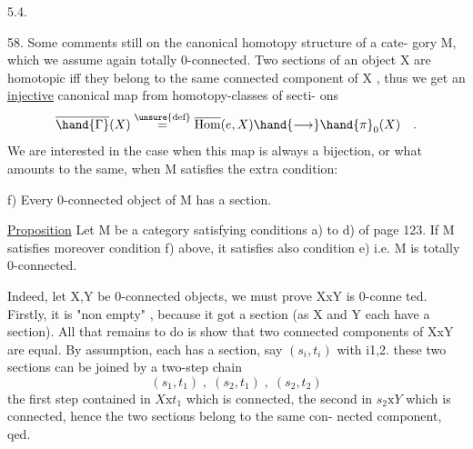 
5.4.

58.  Some comments still on the canonical homotopy structure of a cate-%
gory M,  which we assume again totally 0-connected.  Two sections of an
object X are homotopic iff they belong to the same connected component of
X ,  thus we get an \uline{injective} canonical map from homotopy-classes of secti-%
ons
\[ \overline{\hand{\Gamma}}(X) \overset{\text{\unsure{def}}}{=} \overline{\text{Hom}}(e,X) \hand{\longrightarrow} \hand{\pi}_{0}(X) \quad . \]
We are interested in the case when this map is always a bijection,  or
what amounts to the same,  when M satisfies the extra condition:

f) Every 0-connected object of M has a section.

\uline{Proposition}  Let M be a category satisfying conditions a) to d) of page
123.  If M satisfies moreover condition f) above,  it satisfies also 
condition e)  i.e. M is totally 0-connected.

Indeed,  let X,Y be 0-connected objects,  we must prove XxY is 0-conne%
ted.  Firstly,  it is "non empty" , because it got a section (as X and Y
each have a section).  All that remains to do is show that two connected
components of XxY are equal.  By assumption,  each has a section,  
  say $(s_i,t_i)$  with i\hand{$\in\{$}1,2\hand{$\}$}.  these two sections can be joined by a
two-step chain
\[ (s_1,t_1) \;,\; (s_2,t_1) \;,\; (s_2,t_2) \]
the first step contained in  $X\mathrm{x}t_1$ which is connected,  the second in
$s_2\mathrm{x}Y$  which is connected,  hence the two sections belong to the same con-%
nected component,  qed.

